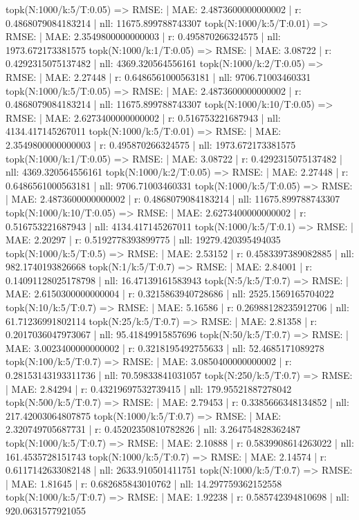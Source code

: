 topk(N:1000/k:5/T:0.05) => RMSE: | MAE: 2.4873600000000002 | r: 0.4868079084183214 | nll: 11675.899788743307
topk(N:1000/k:5/T:0.01) => RMSE: | MAE: 2.3549800000000003 | r: 0.495870266324575 | nll: 1973.672173381575
topk(N:1000/k:1/T:0.05) => RMSE: | MAE: 3.08722 | r: 0.4292315075137482 | nll: 4369.320564556161
topk(N:1000/k:2/T:0.05) => RMSE: | MAE: 2.27448 | r: 0.6486561000563181 | nll: 9706.71003460331
topk(N:1000/k:5/T:0.05) => RMSE: | MAE: 2.4873600000000002 | r: 0.4868079084183214 | nll: 11675.899788743307
topk(N:1000/k:10/T:0.05) => RMSE: | MAE: 2.6273400000000002 | r: 0.516753221687943 | nll: 4134.417145267011
topk(N:1000/k:5/T:0.01) => RMSE: | MAE: 2.3549800000000003 | r: 0.495870266324575 | nll: 1973.672173381575
topk(N:1000/k:1/T:0.05) => RMSE: | MAE: 3.08722 | r: 0.4292315075137482 | nll: 4369.320564556161
topk(N:1000/k:2/T:0.05) => RMSE: | MAE: 2.27448 | r: 0.6486561000563181 | nll: 9706.71003460331
topk(N:1000/k:5/T:0.05) => RMSE: | MAE: 2.4873600000000002 | r: 0.4868079084183214 | nll: 11675.899788743307
topk(N:1000/k:10/T:0.05) => RMSE: | MAE: 2.6273400000000002 | r: 0.516753221687943 | nll: 4134.417145267011
topk(N:1000/k:5/T:0.1) => RMSE: | MAE: 2.20297 | r: 0.5192778393899775 | nll: 19279.420395494035
topk(N:1000/k:5/T:0.5) => RMSE: | MAE: 2.53152 | r: 0.4583397389082885 | nll: 982.1740193826668
topk(N:1/k:5/T:0.7) => RMSE: | MAE: 2.84001 | r: 0.14091128025178798 | nll: 16.47139161583943
topk(N:5/k:5/T:0.7) => RMSE: | MAE: 2.6150300000000004 | r: 0.3215863940728686 | nll: 2525.1569165704022
topk(N:10/k:5/T:0.7) => RMSE: | MAE: 5.16586 | r: 0.26988128235912706 | nll: 61.71236991802114
topk(N:25/k:5/T:0.7) => RMSE: | MAE: 2.81358 | r: 0.2017036047973067 | nll: 95.41849915857696
topk(N:50/k:5/T:0.7) => RMSE: | MAE: 3.0023400000000002 | r: 0.3218195492755633 | nll: 52.4685171089278
topk(N:100/k:5/T:0.7) => RMSE: | MAE: 3.0850400000000002 | r: 0.28153143193311736 | nll: 70.59833841031057
topk(N:250/k:5/T:0.7) => RMSE: | MAE: 2.84294 | r: 0.43219697532739415 | nll: 179.95521887278042
topk(N:500/k:5/T:0.7) => RMSE: | MAE: 2.79453 | r: 0.3385666348134852 | nll: 217.42003064807875
topk(N:1000/k:5/T:0.7) => RMSE: | MAE: 2.320749705687731 | r: 0.45202350810782826 | nll: 3.264754828362487
topk(N:1000/k:5/T:0.7) => RMSE: | MAE: 2.10888 | r: 0.5839908614263022 | nll: 161.4535728151743
topk(N:1000/k:5/T:0.7) => RMSE: | MAE: 2.14574 | r: 0.6117142633082148 | nll: 2633.910501411751
topk(N:1000/k:5/T:0.7) => RMSE: | MAE: 1.81645 | r: 0.682685843010762 | nll: 14.297759362152558
topk(N:1000/k:5/T:0.7) => RMSE: | MAE: 1.92238 | r: 0.585742394810698 | nll: 920.0631577921055

